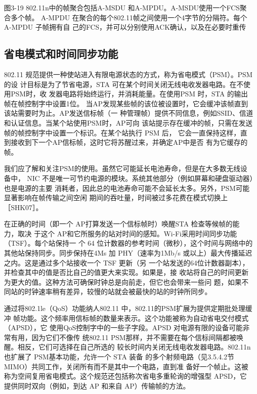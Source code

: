 图3-19
802.11n中的帧聚合包括A-MSDU 和A-MPDU。A-MSDU使用一个FCS聚合多个帧。
A-MPDU 在聚合的每个802.11帧之间使用一个4字节的分隔符。每个A-MPDU 子帧拥有自
己的FCS，并可以分别使用ACK确认，以及在必要时重传

\subsection{省电模式和时间同步功能}

802.11 规范提供一种使站进入有限电源状态的方式，称为省电模式（PSM）。PSM的设
计目标是为了节省电源，STA 可在某个时间关闭无线电收发器电路。在不使用PSM时，收
发器电路将始终运行，并消耗能量。在使用PSM 时，STA 的输出帧在帧控制字中设置1位。
当AP发现某些帧的该位被设置时，它会缓冲该帧直到该站需要时为止。AP发送信标帧（一
种管理帧）提供不同信息，例如SSID、信道和认证信息。当某个站使用PSM时，AP可向
该站提示存在缓冲的帧，只需在发送帧的帧控制字中设置一个标识。在某个站执行 PSM 后，
它会一直保持这样，直到接收到下一个AP信标帧，这时它将苏醒过来，并确定AP中是否
有为它缓存的帧。

我们应了解和关注PSM的使用。虽然它可能延长电池寿命，但是在大多数无线设备中，
NIC 不是唯一可节约电源的模块。系统其他部分（例如屏幕和硬盘驱动器）也是电源的主要
消耗者，因此总的电池寿命可能不会延长太多。另外，PSM可能显著影响在帧传输之间空闲
期间的吞吐量，时间被过多花费在模式切换上［SHK07］。

在正确的时间（即一个 AP打算发送一个信标帧时）唤醒STA 检查等候帧的能力，取决
于这个 AP和它所服务的站对时间的感知。Wi-Fi采用时间同步功能（TSF）。每个站保持一
个 64 位计数器的参考时间（微秒），这个时间与网络中的其他站保持同步。同步保持在4Ms
加 PHY（速率为1Mb/s 或以上）最大传播延迟之内。这是通过多个站接收一个 TSF 更新（另
一个站发送的64位计数器副本），并检查其中的值是否比自己的值更大来实现。如果是，接
收站将自己的时间更新为更大的值。这种方法可确保时钟总是向前走，但它也会带来一些问
题，如果不同站的时钟速率稍有差异，较慢的站就会被最快的站的时钟所同步。

通过将802.1le（QoS）功能纳人802.11 中，802.11的PSM扩展为提供定期批处理缓冲
帧功能。这个频率用信标帧的数量来表示。这个功能被称为自动省电交付模式（APSD），它
使用QoS控制字中的一些子字段。APSD 对电源有限的设备可能非常有用，因为它们不像传
统802.11 PSM那样，并不需要在每个信标间隔都被唤醒。相反，它们可选择在自己所选的
较长时间内关闭无线电收发器电路。802.11n 也扩展了 PSM基本功能，允许一个 STA 装备
的多个射频电路（见3.5.4.2节 MIMO）共同工作，关闭所有而不是其中一个电路，直到准
备好一个帧止。这被称为空间复用省电模式。这个规范还包括称次省电多重轮询的增强型
APSD，它提供同时双向（例如，到达 AP 和来自 AP）传输帧的方法。

